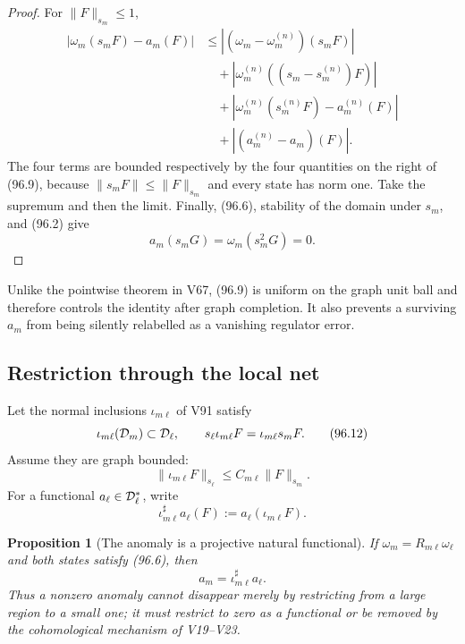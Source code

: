 \documentclass[11pt]{article}
\newtheorem{proposition}[theorem]{Proposition}
\theoremstyle{remark}
\begin{document}
\begin{proof}
For \(\|F\|_{s_m}\leq1\),
\[
\begin{split}
 |\omega_m(s_mF)-a_m(F)|
 &\leq
 |(\omega_m-\omega_m^{(n)})(s_mF)|\\
 &\quad+
 |\omega_m^{(n)}((s_m-s_m^{(n)})F)|\\
 &\quad+
 |\omega_m^{(n)}(s_m^{(n)}F)-a_m^{(n)}(F)|\\
 &\quad+
 |(a_m^{(n)}-a_m)(F)|.
                                                                    \tag{96.11}
\end{split}
\]
The four terms are bounded respectively by the four quantities on
the right of (96.9), because
\(\|s_mF\|\leq\|F\|_{s_m}\) and every state has norm one.  Take the
supremum and then the limit.  Finally, (96.6), stability of the
domain under \(s_m\), and (96.2) give
\[
 a_m(s_mG)=\omega_m(s_m^2G)=0.
\]
\end{proof}

Unlike the pointwise theorem in V67, (96.9) is uniform on the graph
unit ball and therefore controls the identity after graph
completion.  It also prevents a surviving \(a_m\) from being
silently relabelled as a vanishing regulator error.

\subsection{Restriction through the local net}

Let the normal inclusions \(\iota_{m\ell}\) of V91 satisfy
\[
 \iota_{m\ell}({\cal D}_m)\subset{\cal D}_\ell,\qquad
 s_\ell\iota_{m\ell}F=\iota_{m\ell}s_mF.                         \tag{96.12}
\]
Assume they are graph bounded:
\[
 \|\iota_{m\ell}F\|_{s_\ell}
 \leq C_{m\ell}\|F\|_{s_m}.                                     \tag{96.13}
\]
For a functional \(a_\ell\in{\cal D}_\ell^*\), write
\[
 \iota_{m\ell}^{\sharp}a_\ell(F)
 :=a_\ell(\iota_{m\ell}F).                                      \tag{96.14}
\]

\begin{proposition}[The anomaly is a projective natural
functional]
\label{prop:v12v96-natural}
If \(\omega_m=R_{m\ell}\omega_\ell\) and both states satisfy
(96.6), then
\[
 a_m=\iota_{m\ell}^{\sharp}a_\ell.                              \tag{96.15}
\]
Thus a nonzero anomaly cannot disappear merely by restricting from
a large region to a small one; it must restrict to zero as a
functional or be removed by the cohomological mechanism of
V19--V23.
\end{proposition}
\end{document}

